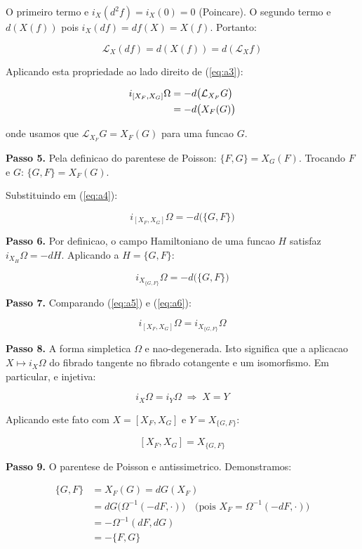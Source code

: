 \documentclass[12pt,a4paper,oneside]{article}
\begin{document}
O primeiro termo e $i_X(d^2f) = i_X(0) = 0$ (Poincare). O segundo termo e
$d(X(f))$ pois $i_X(df) = df(X) = X(f)$. Portanto:

$$\mathcal{L}_X(df) = d(X(f)) = d(\mathcal{L}_X f)$$

Aplicando esta propriedade ao lado direito de (\ref{eq:a3}):

\begin{align}
i_{[X_F,X_G]}\Omega &= -d\big(\mathcal{L}_{X_F} G\big) \notag\\
&= -d\big(X_F(G)\big) \label{eq:a4}
\end{align}

onde usamos que $\mathcal{L}_{X_F}G = X_F(G)$ para uma funcao $G$.

\textbf{Passo 5.} Pela definicao do parentese de Poisson:
$\{F,G\} = X_G(F)$. Trocando $F$ e $G$: $\{G,F\} = X_F(G)$.

Substituindo em (\ref{eq:a4}):

\begin{equation}\label{eq:a5}
i_{[X_F,X_G]}\Omega = -d\big(\{G,F\}\big)
\end{equation}

\textbf{Passo 6.} Por definicao, o campo Hamiltoniano de uma funcao $H$
satisfaz $i_{X_H}\Omega = -dH$. Aplicando a $H = \{G,F\}$:

\begin{equation}\label{eq:a6}
i_{X_{\{G,F\}}}\Omega = -d\big(\{G,F\}\big)
\end{equation}

\textbf{Passo 7.} Comparando (\ref{eq:a5}) e (\ref{eq:a6}):

$$i_{[X_F,X_G]}\Omega = i_{X_{\{G,F\}}}\Omega$$

\textbf{Passo 8.} A forma simpletica $\Omega$ e nao-degenerada. Isto
significa que a aplicacao $X \mapsto i_X\Omega$ do fibrado tangente no
fibrado cotangente e um isomorfismo. Em particular, e injetiva:

$$i_X\Omega = i_Y\Omega \;\Longrightarrow\; X = Y$$

Aplicando este fato com $X = [X_F,X_G]$ e $Y = X_{\{G,F\}}$:

$$[X_F,X_G] = X_{\{G,F\}}$$

\textbf{Passo 9.} O parentese de Poisson e antissimetrico. Demonstramos:

\begin{align*}
\{G,F\} &= X_F(G) = dG(X_F) \\
&= dG\big(\Omega^{-1}(-dF, \cdot)\big) \quad\text{(pois } X_F = \Omega^{-1}(-dF,\cdot))\\
&= -\Omega^{-1}(dF, dG) \\
&= -\{F,G\}
\end{align*}
\end{document}
